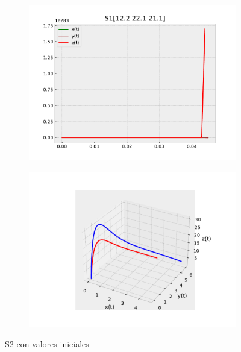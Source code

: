 \documentclass{wscpaperproc}
\theoremstyle{wsc}
\begin{document}
\begin{figure}[h]
	\centering
	\begin{subfigure}[b]{0.5\textwidth}
		\centering
		\includegraphics[width=\textwidth]{Simulations/S1[12.2 22.1 21.1].pdf}
	
		\label{fig:comparativa31}
	\end{subfigure}%
	\begin{subfigure}[b]{0.5\textwidth}
		\centering
		\includegraphics[width=\textwidth]{Simulations/S13d.pdf}
		\label{fig:comparativa32}
	\end{subfigure}
	\caption{S2 con valores iniciales}

	\label{fig:comparacion3}
\end{figure}
\end{document}

